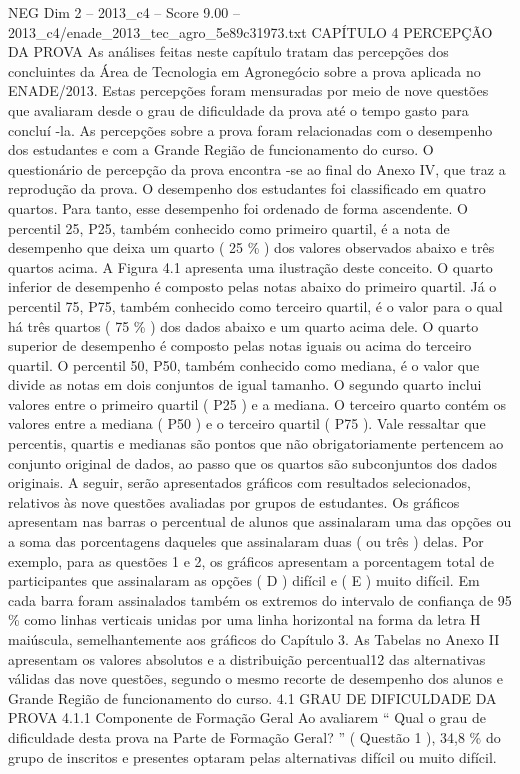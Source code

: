 \begin{textsample}{NEG Dim 2 – 2013\_c4 – Score 9.00 – 2013\_c4/enade\_2013\_tec\_agro\_5e89c31973.txt}  \label{ex:f2_neg_365}
CAPÍTULO 4 PERCEPÇÃO DA PROVA As análises feitas neste capítulo tratam das percepções dos concluintes da Área de Tecnologia em Agronegócio sobre a prova aplicada no ENADE/2013.
Estas percepções foram mensuradas por meio de nove questões que avaliaram desde o grau de dificuldade da prova até o tempo gasto para concluí -la.
As percepções sobre a prova foram relacionadas com o desempenho dos estudantes e com a Grande Região de funcionamento do curso.
O questionário de percepção da prova encontra -se ao final do Anexo IV, que traz a reprodução da prova.
O desempenho dos estudantes foi classificado em quatro quartos.
Para tanto, esse desempenho foi ordenado de forma ascendente.
O percentil 25, P25, também conhecido como primeiro quartil, é a nota de desempenho que deixa um quarto ( 25 \% ) dos valores observados abaixo e três quartos acima.
A Figura 4.1 apresenta uma ilustração deste conceito.
O quarto inferior de desempenho é composto pelas notas abaixo do primeiro quartil.
Já o percentil 75, P75, também conhecido como terceiro quartil, é o valor para o qual há três quartos ( 75 \% ) dos dados abaixo e um quarto acima dele.
O quarto superior de desempenho é composto pelas notas iguais ou acima do terceiro quartil.
O percentil 50, P50, também conhecido como mediana, é o valor que divide as notas em dois conjuntos de igual tamanho.
O segundo quarto inclui valores entre o primeiro quartil ( P25 ) e a mediana.
O terceiro quarto contém os valores entre a mediana ( P50 ) e o terceiro quartil ( P75 ).
Vale ressaltar que percentis, quartis e medianas são pontos que não obrigatoriamente pertencem ao conjunto original de dados, ao passo que os quartos são subconjuntos dos dados originais.
A seguir, serão apresentados gráficos com resultados selecionados, relativos às nove questões avaliadas por grupos de estudantes.
Os gráficos apresentam nas barras o percentual de alunos que assinalaram uma das opções ou a soma das porcentagens daqueles que assinalaram duas ( ou três ) delas.
Por exemplo, para as questões 1 e 2, os gráficos apresentam a porcentagem total de participantes que assinalaram as opções ( D ) difícil e ( E ) muito difícil.
Em cada barra foram assinalados também os extremos do intervalo de confiança de 95 \% como linhas verticais unidas por uma linha horizontal na forma da letra H maiúscula, semelhantemente aos gráficos do Capítulo 3.
As Tabelas no Anexo II apresentam os valores absolutos e a distribuição percentual12 das alternativas válidas das nove questões, segundo o mesmo recorte de desempenho dos alunos e Grande Região de funcionamento do curso. 4.1 GRAU DE DIFICULDADE DA PROVA 4.1.1 Componente de Formação Geral Ao avaliarem “ Qual o grau de dificuldade desta prova na Parte de Formação Geral? ” ( Questão 1 ), 34,8 \% do grupo de inscritos e presentes optaram pelas alternativas difícil ou muito difícil.

\end{textsample}
